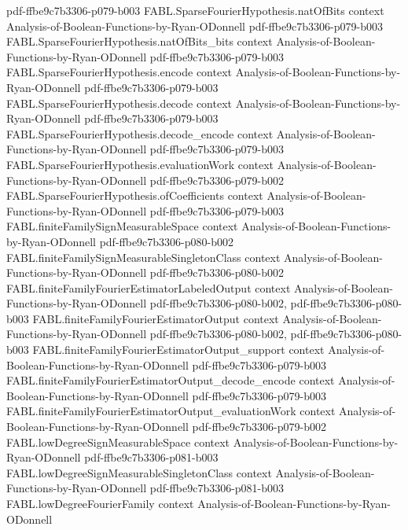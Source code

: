 \begin{theorem}
  {pdf-ffbe9c7b3306-p079-b003}
\proofstep
  {FABL.SparseFourierHypothesis.natOfBits}
  {context}
  {Analysis-of-Boolean-Functions-by-Ryan-ODonnell}
  {pdf-ffbe9c7b3306-p079-b003}
\proofstep
  {FABL.SparseFourierHypothesis.natOfBits_bits}
  {context}
  {Analysis-of-Boolean-Functions-by-Ryan-ODonnell}
  {pdf-ffbe9c7b3306-p079-b003}
\proofstep
  {FABL.SparseFourierHypothesis.encode}
  {context}
  {Analysis-of-Boolean-Functions-by-Ryan-ODonnell}
  {pdf-ffbe9c7b3306-p079-b003}
\proofstep
  {FABL.SparseFourierHypothesis.decode}
  {context}
  {Analysis-of-Boolean-Functions-by-Ryan-ODonnell}
  {pdf-ffbe9c7b3306-p079-b003}
\proofstep
  {FABL.SparseFourierHypothesis.decode_encode}
  {context}
  {Analysis-of-Boolean-Functions-by-Ryan-ODonnell}
  {pdf-ffbe9c7b3306-p079-b003}
\proofstep
  {FABL.SparseFourierHypothesis.evaluationWork}
  {context}
  {Analysis-of-Boolean-Functions-by-Ryan-ODonnell}
  {pdf-ffbe9c7b3306-p079-b002}
\proofstep
  {FABL.SparseFourierHypothesis.ofCoefficients}
  {context}
  {Analysis-of-Boolean-Functions-by-Ryan-ODonnell}
  {pdf-ffbe9c7b3306-p079-b003}
\proofstep
  {FABL.finiteFamilySignMeasurableSpace}
  {context}
  {Analysis-of-Boolean-Functions-by-Ryan-ODonnell}
  {pdf-ffbe9c7b3306-p080-b002}
\proofstep
  {FABL.finiteFamilySignMeasurableSingletonClass}
  {context}
  {Analysis-of-Boolean-Functions-by-Ryan-ODonnell}
  {pdf-ffbe9c7b3306-p080-b002}
\proofstep
  {FABL.finiteFamilyFourierEstimatorLabeledOutput}
  {context}
  {Analysis-of-Boolean-Functions-by-Ryan-ODonnell}
  {pdf-ffbe9c7b3306-p080-b002,
    pdf-ffbe9c7b3306-p080-b003}
\proofstep
  {FABL.finiteFamilyFourierEstimatorOutput}
  {context}
  {Analysis-of-Boolean-Functions-by-Ryan-ODonnell}
  {pdf-ffbe9c7b3306-p080-b002,
    pdf-ffbe9c7b3306-p080-b003}
\proofstep
  {FABL.finiteFamilyFourierEstimatorOutput_support}
  {context}
  {Analysis-of-Boolean-Functions-by-Ryan-ODonnell}
  {pdf-ffbe9c7b3306-p079-b003}
\proofstep
  {FABL.finiteFamilyFourierEstimatorOutput_decode_encode}
  {context}
  {Analysis-of-Boolean-Functions-by-Ryan-ODonnell}
  {pdf-ffbe9c7b3306-p079-b003}
\proofstep
  {FABL.finiteFamilyFourierEstimatorOutput_evaluationWork}
  {context}
  {Analysis-of-Boolean-Functions-by-Ryan-ODonnell}
  {pdf-ffbe9c7b3306-p079-b002}
\proofstep
  {FABL.lowDegreeSignMeasurableSpace}
  {context}
  {Analysis-of-Boolean-Functions-by-Ryan-ODonnell}
  {pdf-ffbe9c7b3306-p081-b003}
\proofstep
  {FABL.lowDegreeSignMeasurableSingletonClass}
  {context}
  {Analysis-of-Boolean-Functions-by-Ryan-ODonnell}
  {pdf-ffbe9c7b3306-p081-b003}
\proofstep
  {FABL.lowDegreeFourierFamily}
  {context}
  {Analysis-of-Boolean-Functions-by-Ryan-ODonnell}

\end{theorem}
